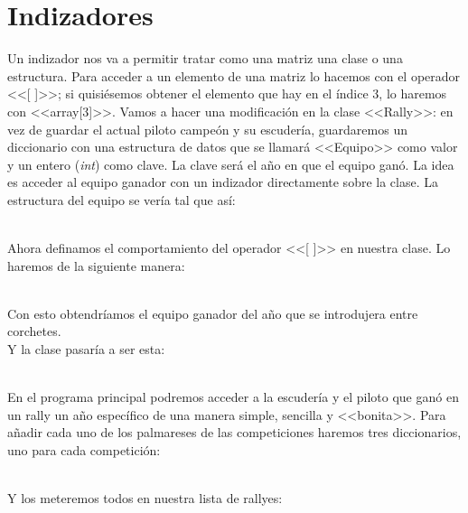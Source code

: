 \documentclass[11pt, oneside]{book}		%
\begin{document}
\chapter{Indizadores}
Un indizador\cite{msdn:indizador} nos va a permitir tratar como una matriz una clase o una estructura. Para acceder a un elemento de una matriz lo hacemos con el operador <<[ ]>>; si quisiésemos obtener el elemento que hay en el índice 3, lo haremos con <<array[3]>>. Vamos a hacer una modificación en la clase <<Rally>>: en vez de guardar el actual piloto campeón y su escudería, guardaremos un diccionario con una estructura de datos que se llamará <<Equipo>> como valor y un entero (\textit{int}) como clave. La clave será el año en que el equipo ganó. La idea es acceder al equipo ganador con un indizador directamente sobre la clase. La estructura del equipo se vería tal que así:
\\\\\begin{minipage}[c]{0.95\textwidth}
	
\end{minipage}
Ahora definamos el comportamiento del operador <<[ ]>> en nuestra clase. Lo haremos de la siguiente manera:
\\\\\begin{minipage}[c]{0.95\textwidth}
	
\end{minipage}
Con esto obtendríamos el equipo ganador del año que se introdujera entre corchetes.\\
Y la clase pasaría a ser esta:
\\\\\begin{minipage}[c]{0.95\textwidth}
	
\end{minipage}
En el programa principal podremos acceder a la escudería y el piloto que ganó en un rally un año específico de una manera simple, sencilla y <<bonita>>. Para añadir cada uno de los palmareses de las competiciones haremos tres diccionarios, uno para cada competición:
\\\\\begin{minipage}[c]{0.95\textwidth}
	
\end{minipage}
Y los meteremos todos en nuestra lista de rallyes:
\end{document}
